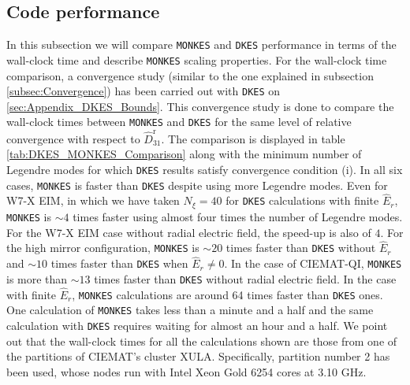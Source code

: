 \documentclass[10pt]{iopart}
\newcommand{\MONKES}{{\texttt{MONKES}}}
\newcommand{\DKES}{{\texttt{DKES}}}
\begin{document}
\subsection{Code performance}\label{subsec:Performance}
 In this subsection we will compare {\MONKES} and {\DKES} performance in terms of the wall-clock time and describe {\MONKES} scaling properties. For the wall-clock time comparison, a convergence study (similar to the one explained in subsection \ref{subsec:Convergence}) has been carried out with {\DKES} on \ref{sec:Appendix_DKES_Bounds}. This convergence study is done to compare the wall-clock times between {\MONKES} and {\DKES} for the same level of relative convergence with respect to $\widehat{D}_{31}^{\text{r}}$. The comparison is displayed in table \ref{tab:DKES_MONKES_Comparison} along with the minimum number of Legendre modes for which {\DKES} results satisfy convergence condition (i). In all six cases, {\MONKES} is faster than {\DKES} despite using more Legendre modes. Even for W7-X EIM, in which we have taken $N_\xi =40$ for {\DKES} calculations with finite $\widehat{E}_r$, {\MONKES} is $\sim 4$ times faster using almost four times the number of Legendre modes. For the W7-X EIM case without radial electric field, the speed-up is also of $ 4$. For the high mirror configuration, {\MONKES} is $\sim 20$ times faster than {\DKES} without $\widehat{E}_r$ and $\sim 10$ times faster than {\DKES} when $\widehat{E}_r \ne 0$. In the case of CIEMAT-QI, {\MONKES} is more than $\sim 13$ times faster than {\DKES} without radial electric field. In the case with finite $\widehat{E}_r$, {\MONKES} calculations are around 64 times faster than {\DKES} ones. One calculation of {\MONKES} takes less than a minute and a half and the same calculation with {\DKES} requires waiting for almost an hour and a half. We point out that the wall-clock times for all the calculations shown are those from one of the partitions of CIEMAT's cluster XULA. Specifically, partition number 2 has been used, whose nodes run with Intel Xeon Gold 6254 cores at 3.10 GHz. 
\end{document}
